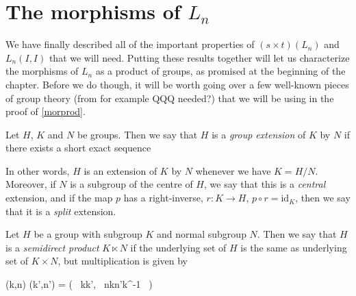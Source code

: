 \documentclass{amsbook} %
\newenvironment{eq*}{\begin{equation*}}{\end{equation*}}
\numberwithin{section}{chapter}
\begin{document}
\section{The morphisms of \texorpdfstring{$L_n$}{L_n}} 

We have finally described all of the important properties of $(s \times t)(L_n)$ and $L_n(I,I)$ that we will need. Putting these results together will let us characterize the morphisms of $L_n$ as a product of groups, as promised at the beginning of the chapter. Before we do though, it will be worth going over a few well-known pieces of group theory (from for example \cite{rob-grouptheory} QQQ needed?) that we will be using in the proof of \cref{morprod}.

\begin{Defi} Let $H$, $K$ and $N$ be groups. Then we say that $H$ is a \emph{group extension} of $K$ by $N$ if there exists a short exact sequence
\begin{eq*}  \end{eq*}
In other words, $H$ is an extension of $K$ by $N$ whenever we have $K = H/N$. Moreover, if $N$ is a subgroup of the centre of $H$, we say that this is a \emph{central} extension, and if the map $p$ has a right-inverse, $r: K \to H$, $p \circ r = \mathrm{id}_K$, then we say that it is a \emph{split} extension.
\end{Defi}

\begin{Defi} Let $H$ be a group with subgroup $K$ and normal subgroup $N$. Then we say that $H$ is a \emph{semidirect product} $K \ltimes N$ if the underlying set of $H$ is the same as underlying set of $K \times N$, but multiplication is given by
\begin{eq*} (k,n) \cdot (k',n') \quad = \quad ( \, kk', \, nkn'k^{-1} \, ) \end{eq*}
\end{Defi}
\end{document}
